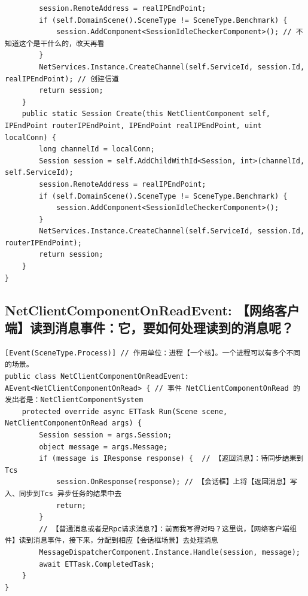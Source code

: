 \documentclass[9pt, b5paper]{article}
\begin{document}
\begin{verbatim}
        session.RemoteAddress = realIPEndPoint;
        if (self.DomainScene().SceneType != SceneType.Benchmark) {
            session.AddComponent<SessionIdleCheckerComponent>(); // 不知道这个是干什么的，改天再看
        }
        NetServices.Instance.CreateChannel(self.ServiceId, session.Id, realIPEndPoint); // 创建信道
        return session;
    }
    public static Session Create(this NetClientComponent self, IPEndPoint routerIPEndPoint, IPEndPoint realIPEndPoint, uint localConn) {
        long channelId = localConn;
        Session session = self.AddChildWithId<Session, int>(channelId, self.ServiceId);
        session.RemoteAddress = realIPEndPoint;
        if (self.DomainScene().SceneType != SceneType.Benchmark) {
            session.AddComponent<SessionIdleCheckerComponent>();
        }
        NetServices.Instance.CreateChannel(self.ServiceId, session.Id, routerIPEndPoint);
        return session;
    }
}
\end{verbatim}
\subsection{NetClientComponentOnReadEvent: 【网络客户端】读到消息事件：它，要如何处理读到的消息呢？}
\label{sec-3-9}
\begin{verbatim}
[Event(SceneType.Process)] // 作用单位：进程【一个核】。一个进程可以有多个不同的场景。
public class NetClientComponentOnReadEvent: AEvent<NetClientComponentOnRead> { // 事件 NetClientComponentOnRead 的发出者是：NetClientComponentSystem
    protected override async ETTask Run(Scene scene, NetClientComponentOnRead args) {
        Session session = args.Session;
        object message = args.Message;
        if (message is IResponse response) {  // 【返回消息】：待同步结果到Tcs
            session.OnResponse(response); // 【会话框】上将【返回消息】写入、同步到Tcs 异步任务的结果中去
            return;
        }
        // 【普通消息或者是Rpc请求消息?】：前面我写得对吗？这里说，【网络客户端组件】读到消息事件，接下来，分配到相应【会话框场景】去处理消息 
        MessageDispatcherComponent.Instance.Handle(session, message);
        await ETTask.CompletedTask;
    }
}
\end{verbatim}
\end{document}

